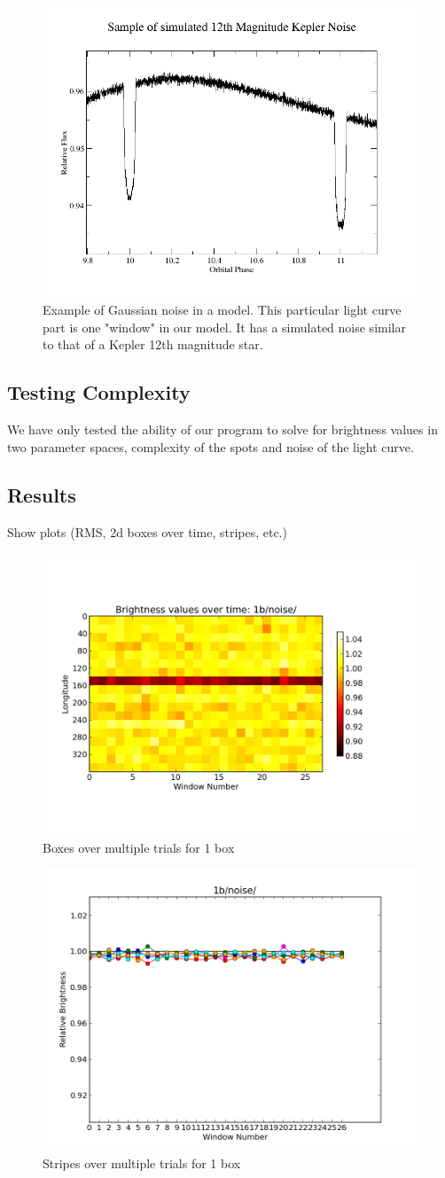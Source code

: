 \documentclass[iop]{emulateapj}
\begin{document}
\begin{figure}[h]
	\centering
	\includegraphics[width=.5\textwidth]{images/12_noise.png}
	\caption{Example of Gaussian noise in a model. This particular light curve part is one "window" in our model. It has a simulated noise similar to that of a Kepler 12th magnitude star.}
	\label{noise}
\end{figure}

\subsection{Testing Complexity}
We have only tested the ability of our program to solve for brightness values in two parameter spaces, complexity of the spots and noise of the light curve.

\subsection{Results}
Show plots (RMS, 2d boxes over time, stripes, etc.)
\begin{figure}[h]
	\centering
	\includegraphics[width=.5\textwidth]{images/1b/noise/region_plot.png}
	\caption{Boxes over multiple trials for 1 box}
	\label{1b/noise}
\end{figure}
\begin{figure}[h]
	\centering
	\includegraphics[width=.5\textwidth]{images/1b/noise/stripes_over_time.png}
	\caption{Stripes over multiple trials for 1 box}
	\label{1b/noise/stripes}
\end{figure}
\end{document}
